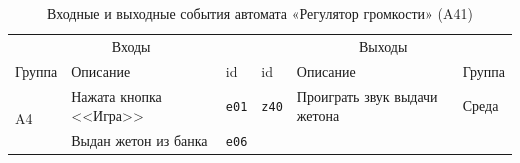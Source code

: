 \begin{table}[H]
\centering
\caption{Входные и выходные события автомата «Регулятор громкости» (A41)}
\small
\begin{tabular}{@{}p{1.3cm}p{4.6cm}l|lp{4.6cm}p{1.3cm}@{}}
\toprule
\multicolumn{3}{c}{Входы} & \multicolumn{3}{c}{Выходы} \\
Группа & Описание & id & id & Описание & Группа \\
\midrule
\multirow{2}{*}{A4} & Нажата кнопка <<Игра>> & \texttt{e01} & \texttt{z40} & Проиграть звук выдачи жетона & \multirow{1}{*}{Среда} \\
\cline{4-6}
 & Выдан жетон из банка & \texttt{e06} &  &  &  \\
\bottomrule
\end{tabular}
\end{table}